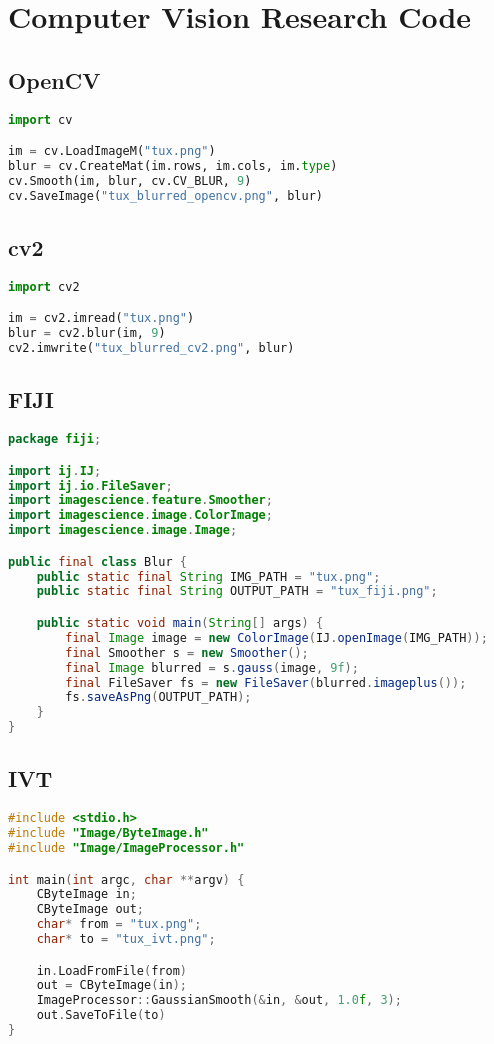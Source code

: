 \section{Computer Vision Research Code}

\subsection{OpenCV}
\begin{lstlisting}[language=Python,
breaklines=true,
caption={Using OpenCV to blur an image},
label=lst:opencv]
import cv

im = cv.LoadImageM("tux.png")
blur = cv.CreateMat(im.rows, im.cols, im.type)
cv.Smooth(im, blur, cv.CV_BLUR, 9)
cv.SaveImage("tux_blurred_opencv.png", blur)
\end{lstlisting}

\subsection{cv2}
\begin{lstlisting}[language=Python,
caption={Using cv2 to blur an image},
label=lst:cv2]
import cv2

im = cv2.imread("tux.png")
blur = cv2.blur(im, 9)
cv2.imwrite("tux_blurred_cv2.png", blur)
\end{lstlisting}

\subsection{FIJI}
\begin{lstlisting}[language=Java,
breaklines=true,
caption={Using FIJI to blur an image},
label=lst:fiji]
package fiji;

import ij.IJ;
import ij.io.FileSaver;
import imagescience.feature.Smoother;
import imagescience.image.ColorImage;
import imagescience.image.Image;

public final class Blur {
	public static final String IMG_PATH = "tux.png";
	public static final String OUTPUT_PATH = "tux_fiji.png";

	public static void main(String[] args) {
		final Image image = new ColorImage(IJ.openImage(IMG_PATH));
		final Smoother s = new Smoother();
		final Image blurred = s.gauss(image, 9f);
		final FileSaver fs = new FileSaver(blurred.imageplus());
		fs.saveAsPng(OUTPUT_PATH);
	}
}
\end{lstlisting}

\subsection{IVT}
\begin{lstlisting}[language=C++,
breaklines=true,
caption={Using IVT to blur an image},
label=lst:ivt]
#include <stdio.h>
#include "Image/ByteImage.h"
#include "Image/ImageProcessor.h"

int main(int argc, char **argv) {
	CByteImage in;
	CByteImage out;
	char* from = "tux.png";
	char* to = "tux_ivt.png";

	in.LoadFromFile(from)
	out = CByteImage(in);
	ImageProcessor::GaussianSmooth(&in, &out, 1.0f, 3);
	out.SaveToFile(to)
}
\end{lstlisting}
